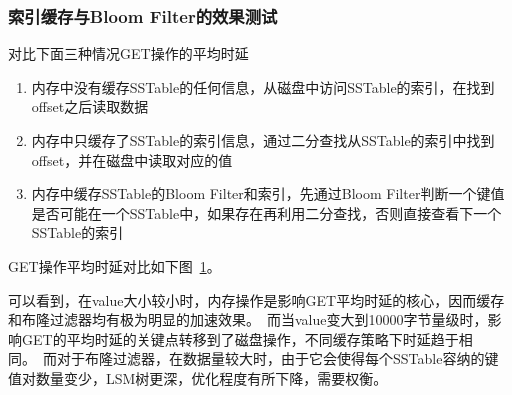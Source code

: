 \documentclass[UTF8]{article}
\begin{document}
\subsubsection{索引缓存与Bloom Filter的效果测试}
对比下面三种情况GET操作的平均时延
\begin{enumerate}
    \item 内存中没有缓存SSTable的任何信息，从磁盘中访问SSTable的索引，在找到offset之后读取数据
    \item 内存中只缓存了SSTable的索引信息，通过二分查找从SSTable的索引中找到offset，并在磁盘中读取对应的值
    \item 内存中缓存SSTable的Bloom Filter和索引，先通过Bloom Filter判断一个键值是否可能在一个SSTable中，如果存在再利用二分查找，否则直接查看下一个SSTable的索引
\end{enumerate}
GET操作平均时延对比如下图~\ref{fig:不同数量的数据下，缓存策略对GET平均时延随value大小变化影响示意图}。
\begin{figure}[h]
    \centering
    \label{fig:不同数量的数据下，缓存策略对GET平均时延随value大小变化影响示意图}
\end{figure}
可以看到，在value大小较小时，内存操作是影响GET平均时延的核心，因而缓存和布隆过滤器均有极为明显的加速效果。\
而当value变大到10000字节量级时，影响GET的平均时延的关键点转移到了磁盘操作，不同缓存策略下时延趋于相同。\
而对于布隆过滤器，在数据量较大时，由于它会使得每个SSTable容纳的键值对数量变少，LSM树更深，优化程度有所下降，需要权衡。
\end{document}
